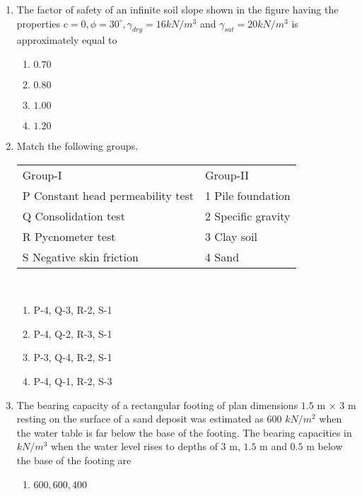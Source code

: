 \documentclass[journal,12pt,onecolumn]{IEEEtran}
\theoremstyle{remark}
\begin{document}
\begin{enumerate}[start=35]
\begin{enumerate}
		  \end{enumerate}
	  \item The factor of safety of an infinite soil slope shown in the figure having the properties $c=0,\phi=30^\circ,\gamma_{dry}=16kN/m^3$ and $\gamma_{sat}=20kN/m^3$ is approximately equal to\\
\begin{figure}[H]
    \centering
\end{figure}
                 \begin{enumerate}
			  \item $0.70$
			  \item $0.80$
			  \item $1.00$
			  \item $1.20$\\
		  \end{enumerate}
	  \item Match the following groups.\\
		  \begin{tabular}{ll} 
			  Group-I & Group-II \\
			  P Constant head permeability test & 1 Pile foundation \\
			  Q Consolidation test & 2 Specific gravity \\
			  R Pycnometer test & 3 Clay soil \\
			  S Negative skin friction & 4 Sand \\
		  \end{tabular}\\
		  \begin{enumerate}
			  \item P-4, Q-3, R-2, S-1
			  \item P-4, Q-2, R-3, S-1
			  \item P-3, Q-4, R-2, S-1
			  \item P-4, Q-1, R-2, S-3\\
		  \end{enumerate}
	  \item The bearing capacity of a rectangular footing of plan dimensions $1.5$ m
$\times$ $3$ m resting on the surface of a sand deposit was estimated as $600$ $kN/m^2$ when the water table is far below the base of the footing. The bearing capacities in $kN/m^3$ when the water level rises to depths of $3$ m, $1.5$ m and $0.5$ m below the base of the footing are 
                  \begin{enumerate}
			  \item $600,600,400$

\end{enumerate}
\end{enumerate}
\end{document}
